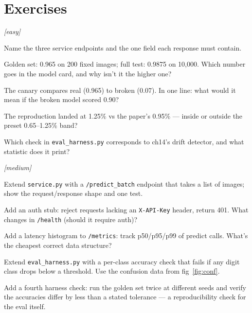 \section{Exercises}
\label{sec:capex}

\emph{[easy]}
\begin{exercise}
Name the three service endpoints and the one field each response
must contain.
\end{exercise}
\begin{exercise}
Golden set: 0.965 on 200 fixed images; full test: 0.9875 on
10{,}000. Which number goes in the model card, and why isn't it
the higher one?
\end{exercise}
\begin{exercise}
The canary compares real (0.965) to broken (0.07). In one line:
what would it mean if the broken model scored 0.90?
\end{exercise}
\begin{exercise}
The reproduction landed at 1.25\% vs the paper's 0.95\% ---
inside or outside the preset 0.65--1.25\% band?
\end{exercise}
\begin{exercise}
Which check in \texttt{eval\_harness.py} corresponds to ch14's
drift detector, and what statistic does it print?
\end{exercise}

\emph{[medium]}
\begin{exercise}
Extend \texttt{service.py} with a \texttt{/predict\_batch} endpoint
that takes a list of images; show the request/response shape and
one test.
\end{exercise}
\begin{exercise}
Add an auth stub: reject requests lacking an \texttt{X-API-Key}
header, return 401. What changes in \texttt{/health} (should it
require auth)?
\end{exercise}
\begin{exercise}
Add a latency histogram to \texttt{/metrics}: track p50/p95/p99 of
predict calls. What's the cheapest correct data structure?
\end{exercise}
\begin{exercise}
Extend \texttt{eval\_harness.py} with a per-class accuracy check
that fails if any digit class drops below a threshold. Use the
confusion data from fig~\ref{fig:conf}.
\end{exercise}
\begin{exercise}
Add a fourth harness check: run the golden set twice at different
seeds and verify the accuracies differ by less than a stated
tolerance --- a reproducibility check for the eval itself.
\end{exercise}

